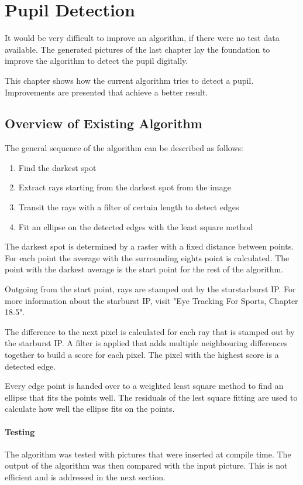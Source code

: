 \chapter{Pupil Detection}
\label{chap:pupildetection}
It would be very difficult to improve an algorithm, if there were no test data available. The generated pictures of the last chapter lay the foundation to improve the algorithm to detect the pupil digitally.

This chapter shows how the current algorithm tries to detect a pupil. Improvements are presented that achieve a better result.
\section{Overview of Existing Algorithm}
The general sequence of the algorithm can be described as follows:
\begin{enumerate}
	\item Find the darkest spot
	\item Extract rays starting from the darkest spot from the image
	\item Transit the rays with a filter of certain length to detect edges
	\item Fit an ellipse on the detected edges with the least square method
\end{enumerate}
The darkest spot is determined by a raster with a fixed distance between points. For each point the average with the surrounding eights point is calculated. The point with the darkest average is the start point for the rest of the algorithm.

Outgoing from the start point, rays are stamped out by the sturstarburst \gls{IP}. For more information about the starburst \gls{IP}, visit "Eye Tracking For Sports, Chapter 18.5"\cite{retoDamian}.

The difference to the next pixel is calculated for each ray that is stamped out by the starburst \gls{IP}. A filter is applied that adds multiple neighbouring differences together to build a score for each pixel. The pixel with the highest score is a detected edge.

Every edge point is handed over to a weighted least square method to find an ellipse that fits the points well. The residuals of the lest square fitting are used to calculate how well the ellipse fits on the points. \cite{retoDamian}

\subsubsection{Testing}
The algorithm was tested with pictures that were inserted at compile time. The output of the algorithm was then compared with the input picture. This is not efficient and is addressed in the next section.
